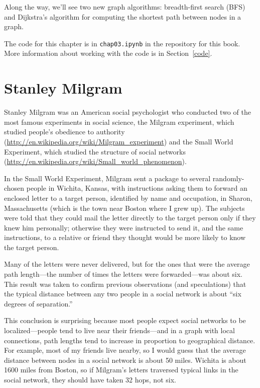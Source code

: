 \documentclass[12pt]{book}
\theoremstyle{exercise}
\begin{document}
Along the way, we'll see two new graph algorithms: breadth-first
search (BFS) and Dijkstra's algorithm for computing the shortest
path between nodes in a graph.

The code for this chapter is in {\tt chap03.ipynb} in the repository
for this book.  More information about working with the code is
in Section~\ref{code}.

\section{Stanley Milgram}

Stanley Milgram was an American social psychologist who conducted
two of the most famous experiments in social science, the
Milgram experiment, which studied people's obedience to authority
(\url{http://en.wikipedia.org/wiki/Milgram_experiment})
and the Small World Experiment, which studied
the structure of social networks
(\url{http://en.wikipedia.org/wiki/Small_world_phenomenon}).

In the Small World Experiment, Milgram sent a package to several
randomly-chosen people in Wichita, Kansas, with instructions asking
them to forward an enclosed letter to a target person, identified by
name and occupation, in Sharon, Massachusetts (which is the town near
Boston where I grew up).  The subjects were told that they could mail
the letter directly to the target person only if they knew him
personally; otherwise they were instructed to send it, and the same
instructions, to a relative or friend they thought would be more
likely to know the target person.

Many of the letters were never delivered, but for the ones that
were the average path length---the number of
times the letters were forwarded---was about six.  This result
was taken to confirm previous observations (and speculations) that
the typical distance between any two people in a social network
is about ``six degrees of separation.''

This conclusion is surprising because most people expect social
networks to be localized---people tend to live near their
friends---and in a graph with local connections, path lengths tend to
increase in proportion to geographical distance.  For example, most of
my friends live nearby, so I would guess that the average distance
between nodes in a social network is about 50 miles.  Wichita is about
1600 miles from Boston, so if Milgram's letters traversed typical
links in the social network, they should have taken 32 hops, not six.
\end{document}
